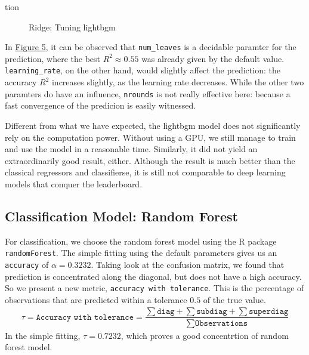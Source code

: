 tion\documentclass[8pt]{article}
\begin{document}
\begin{enumerate}
\begin{figure}[H]
    \caption{Ridge: Tuning lightbgm}
\label{fig:lightbgm}
\end{figure}
In \hyperref[fig:lambda]{Figure 5}, it can be observed that \texttt{num\_leaves} is a decidable 
paramter for the prediction, where the best $R^2 \approx 0.55$ was already given by the default value.
\texttt{learning\_rate}, on the other hand, would slightly affect the prediction: 
the accuracy $R^2$ increases slightly, as the learning rate decreases. While the other two 
paramters do have an influence, \texttt{nrounds} is not really effective here:
because a fast convergence of the predicion is easily witnessed.  

Different from what we have expected, the lightbgm model does not significantly rely on the computation power. 
Without using a GPU, we still manage to train and use the model in a reasonable time. 
Similarly, it did not yield an extraordinarily good result, either. Although the result is much better
than the classical regressors and classifierse, it is still not comparable to deep learning models 
that conquer the leaderboard.

\subsection{Classification Model: Random Forest}
For classification, we choose the random forest model using the R package \texttt{randomForest}.
The simple fitting using the default parameters gives us an \texttt{accuracy} of $\alpha = 0.3232$. 
Taking look at the confusion matrix, we found that prediction is concentrated along the diagonal, 
but does not have a high accuracy. So we present a new metric, \texttt{accuracy with tolerance}. 
This is the percentage of observations that are predicted within a tolerance $0.5$ of the true value.
\begin{align*}
    \tau = \texttt{Accuracy with tolerance} = \dfrac{\sum \texttt{diag} + \sum \texttt{subdiag} + \sum \texttt{superdiag}}{\sum \texttt{Observations}}
\end{align*}
In the simple fitting, $\tau = 0.7232$, which proves a good concentrtion of random forest model. 

\end{enumerate}
\end{document}
